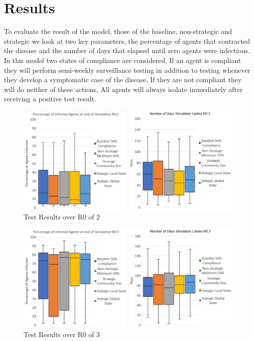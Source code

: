 \documentclass{article}
\begin{document}
\section{Results}

To evaluate the result of the model, those of the baseline, non-strategic and strategic we look at two key parameters, the percentage of agents that contracted the disease and the number of days that elapsed until zero agents were infectious. In this model two states of compliance are considered, If an agent is compliant they will perform semi-weekly surveillance testing in addition to testing whenever they develop a symptomatic case of the disease, If they are not compliant they will do neither of these actions. All agents will always isolate immediately after receiving a positive test result. \newline




\begin{figure}[h!]
\centering
\includegraphics[width=\textwidth]{5}
\caption{Test Results over R0 of 2}
\end{figure}

\begin{figure}[h!]
\centering
\includegraphics[width=\textwidth]{4}
\caption{Test Results over R0 of 3}
\end{figure}
\end{document}

